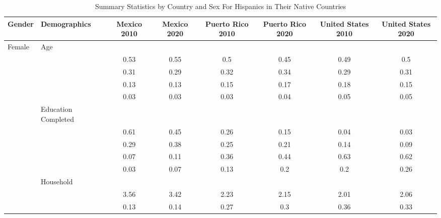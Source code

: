 \documentclass[
]{article}
\begin{document}
\begin{landscape}



\begin{table}[ht]
\centering
\caption{Summary Statistics by Country and Sex For Hispanics in Their Native Countries} 
\begingroup\small
\begin{tabular}{l>{\raggedright\arraybackslash}p{3.2cm}|cccccc}
  \hline
Gender & Demographics & Mexico 2010 & Mexico 2020 & Puerto Rico 2010 & Puerto Rico 2020 & United States 2010 & United States 2020 \\ 
  \hline
Female & Age &  &  &  &  &  &  \\ 
   & \multicolumn{1}{>{\raggedleft\arraybackslash}p{1.5cm}|}{\makebox[1.5cm][r]{60 - 69 }} & 0.53 & 0.55 & 0.5 & 0.45 & 0.49 & 0.5 \\ 
   & \multicolumn{1}{>{\raggedleft\arraybackslash}p{1.5cm}|}{\makebox[1.5cm][r]{70 - 79 }} & 0.31 & 0.29 & 0.32 & 0.34 & 0.29 & 0.31 \\ 
   & \multicolumn{1}{>{\raggedleft\arraybackslash}p{1.5cm}|}{\makebox[1.5cm][r]{80 - 89 }} & 0.13 & 0.13 & 0.15 & 0.17 & 0.18 & 0.15 \\ 
   & \multicolumn{1}{>{\raggedleft\arraybackslash}p{1.5cm}|}{\makebox[1.5cm][r]{90 plus }} & 0.03 & 0.03 & 0.03 & 0.04 & 0.05 & 0.05 \\ 
   & Education Completed &  &  &  &  &  &  \\ 
   & \multicolumn{1}{>{\raggedleft\arraybackslash}p{3.2cm}|}{\makebox[3.2cm][r]{Less than Primary }} & 0.61 & 0.45 & 0.26 & 0.15 & 0.04 & 0.03 \\ 
   & \multicolumn{1}{>{\raggedleft\arraybackslash}p{1.7cm}|}{\makebox[1.7cm][r]{Primary }} & 0.29 & 0.38 & 0.25 & 0.21 & 0.14 & 0.09 \\ 
   & \multicolumn{1}{>{\raggedleft\arraybackslash}p{2cm}|}{\makebox[2cm][r]{Secondary }} & 0.07 & 0.11 & 0.36 & 0.44 & 0.63 & 0.62 \\ 
   & \multicolumn{1}{>{\raggedleft\arraybackslash}p{2cm}|}{\makebox[2cm][r]{University }} & 0.03 & 0.07 & 0.13 & 0.2 & 0.2 & 0.26 \\ 
   & Household &  &  &  &  &  &  \\ 
   & \multicolumn{1}{>{\raggedleft\arraybackslash}p{2.7cm}|}{\makebox[2.7cm][r]{Household Size }} & 3.56 & 3.42 & 2.23 & 2.15 & 2.01 & 2.06 \\ 
   & \multicolumn{1}{>{\raggedleft\arraybackslash}p{2.2cm}|}{\makebox[2.2cm][r]{Lives Alone }} & 0.13 & 0.14 & 0.27 & 0.3 & 0.36 & 0.33 \\ 

\end{tabular}
\end{table}
\end{landscape}
\end{document}
